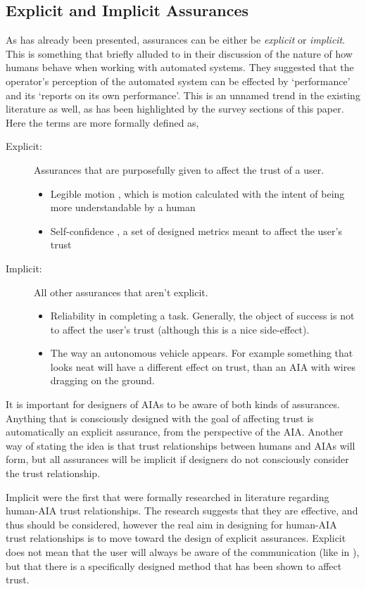 \subsection{Explicit and Implicit Assurances}
As has already been presented, assurances can be either be \emph{explicit} or \emph{implicit}. This is something that \cite{Sheridan1984-kx} briefly alluded to in their discussion of the nature of how humans behave when working with automated systems. They suggested that the operator's perception of the automated system can be effected by `performance' and its `reports on its own performance'. This is an unnamed trend in the existing literature as well, as has been highlighted by the survey sections of this paper. Here the terms are more formally defined as,

\begin{description}
    \item [Explicit:] Assurances that are purposefully given to affect the trust of a user.
    \begin{itemize}
        \item Legible motion \cite{Dragan2013-wd}, which is motion calculated with the intent of being more understandable by a human
        \item Self-confidence \cite{Aitken2016-fb}, a set of designed metrics meant to affect the user's trust
    \end{itemize}
    \item [Implicit:] All other assurances that aren't explicit.
    \begin{itemize}
        \item Reliability in completing a task. Generally, the object of success is not to affect the user's trust (although this is a nice side-effect).
        \item The way an autonomous vehicle appears. For example something that looks neat will have a different effect on trust, than an AIA with wires dragging on the ground. 
    \end{itemize}
\end{description}

It is important for designers of AIAs to be aware of both kinds of assurances. Anything that is consciously designed with the goal of affecting trust is automatically an explicit assurance, from the perspective of the AIA. Another way of stating the idea is that trust relationships between humans and AIAs will form, but all assurances will be implicit if designers do not consciously consider the trust relationship. 

Implicit were the first that were formally researched in literature regarding human-AIA trust relationships. The research suggests that they are effective, and thus should be considered, however the real aim in designing for human-AIA trust relationships is to move toward the design of explicit assurances. Explicit does not mean that the user will always be aware of the communication (like in \cite{Dragan2013-wd}), but that there is a specifically designed method that has been shown to affect trust.
